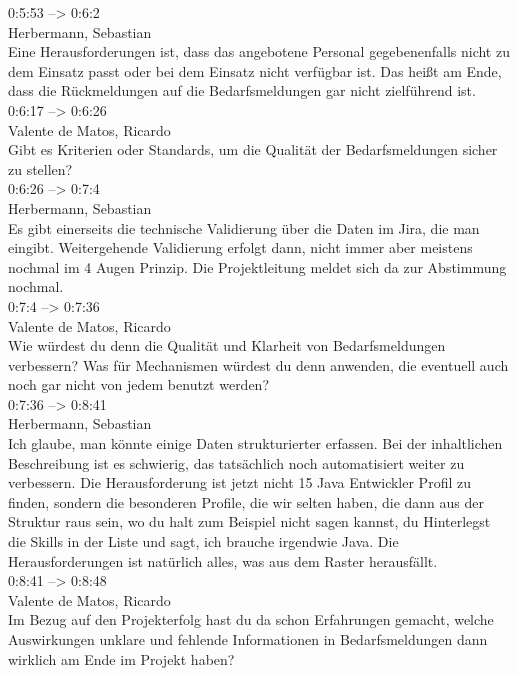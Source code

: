 0:5:53 --> 0:6:2\\
Herbermann, Sebastian\\
Eine Herausforderungen ist, dass das angebotene Personal gegebenenfalls nicht zu dem Einsatz passt oder bei dem Einsatz nicht verfügbar ist. Das heißt am Ende, dass die Rückmeldungen auf die Bedarfsmeldungen gar nicht zielführend ist.\\

0:6:17 --> 0:6:26\\
Valente de Matos, Ricardo\\
Gibt es Kriterien oder Standards, um die Qualität der Bedarfsmeldungen sicher zu stellen?\\

0:6:26 --> 0:7:4\\
Herbermann, Sebastian\\
Es gibt einerseits die technische Validierung über die Daten im Jira, die man eingibt. Weitergehende Validierung erfolgt dann, nicht immer aber meistens nochmal im 4 Augen Prinzip. Die Projektleitung meldet sich da zur Abstimmung nochmal.\\

0:7:4 --> 0:7:36\\
Valente de Matos, Ricardo\\
Wie würdest du denn die Qualität und Klarheit von Bedarfsmeldungen verbessern? Was für Mechanismen würdest du denn anwenden, die eventuell auch noch gar nicht von jedem benutzt werden?\\

0:7:36 --> 0:8:41\\
Herbermann, Sebastian\\
Ich glaube, man könnte einige Daten strukturierter erfassen. Bei der inhaltlichen Beschreibung ist es schwierig, das tatsächlich noch automatisiert weiter zu verbessern. Die Herausforderung ist jetzt nicht 15 Java Entwickler Profil zu finden, sondern die besonderen Profile, die wir selten haben, die dann aus der Struktur raus sein, wo du halt zum Beispiel nicht sagen kannst, du Hinterlegst die Skills in der Liste und sagt, ich brauche irgendwie Java. Die Herausforderungen ist natürlich alles, was aus dem Raster herausfällt.\\

0:8:41 --> 0:8:48\\
Valente de Matos, Ricardo\\
Im Bezug auf den Projekterfolg hast du da schon Erfahrungen gemacht, welche Auswirkungen unklare und fehlende Informationen in Bedarfsmeldungen dann wirklich am Ende im Projekt haben?\\

